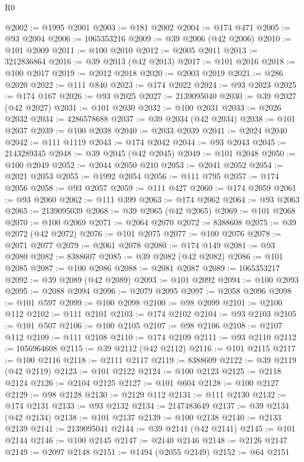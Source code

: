 \begin{lexlean}{R0}
\begin{coremodule}
@2002 := @1995 @2001
@2003 := @181 @2002
@2004 := @174 @471
@2005 := @93 @2004
@2006 := 1065353216
@2009 := @39 @2006 (@42 @2006)
@2010 := @101 @2009
@2011 := @100 @2010
@2012 := @2005 @2011
@2013 := 3212836864
@2016 := @39 @2013 (@42 @2013)
@2017 := @101 @2016
@2018 := @100 @2017
@2019 := @2012 @2018
@2020 := @2003 @2019
@2021 := @286 @2020
@2022 := @111 @840
@2023 := @174 @2022
@2024 := @93 @2023
@2025 := @174 @167
@2026 := @93 @2025
@2027 := 2139095040
@2030 := @39 @2027 (@42 @2027)
@2031 := @101 @2030
@2032 := @100 @2031
@2033 := @2026 @2032
@2034 := 4286578688
@2037 := @39 @2034 (@42 @2034)
@2038 := @101 @2037
@2039 := @100 @2038
@2040 := @2033 @2039
@2041 := @2024 @2040
@2042 := @111 @1119
@2043 := @174 @2042
@2044 := @93 @2043
@2045 := 2143289345
@2048 := @39 @2045 (@42 @2045)
@2049 := @101 @2048
@2050 := @100 @2049
@2052 := @2044 @2050 @210
@2053 := @2041 @2052
@2054 := @2021 @2053
@2055 := @1992 @2054
@2056 := @111 @795
@2057 := @174 @2056
@2058 := @93 @2057
@2059 := @111 @427
@2060 := @174 @2059
@2061 := @93 @2060
@2062 := @111 @399
@2063 := @174 @2062
@2064 := @93 @2063
@2065 := 2139095039
@2068 := @39 @2065 (@42 @2065)
@2069 := @101 @2068
@2070 := @100 @2069
@2071 := @2064 @2070
@2072 := 8388608
@2075 := @39 @2072 (@42 @2072)
@2076 := @101 @2075
@2077 := @100 @2076
@2078 := @2071 @2077
@2079 := @2061 @2078
@2080 := @174 @149
@2081 := @93 @2080
@2082 := 8388607
@2085 := @39 @2082 (@42 @2082)
@2086 := @101 @2085
@2087 := @100 @2086
@2088 := @2081 @2087
@2089 := 1065353217
@2092 := @39 @2089 (@42 @2089)
@2093 := @101 @2092
@2094 := @100 @2093
@2095 := @2088 @2094
@2096 := @2079 @2095
@2097 := @2058 @2096
@2098 := @101 @597
@2099 := @100 @2098
@2100 := @98 @2099
@2101 := @2100 @112
@2102 := @111 @2101
@2103 := @174 @2102
@2104 := @93 @2103
@2105 := @101 @507
@2106 := @100 @2105
@2107 := @98 @2106
@2108 := @2107 @112
@2109 := @111 @2108
@2110 := @174 @2109
@2111 := @93 @2110
@2112 := 1056964608
@2115 := @39 @2112 (@42 @2112)
@2116 := @101 @2115
@2117 := @100 @2116
@2118 := @2111 @2117
@2119 := 8388609
@2122 := @39 @2119 (@42 @2119)
@2123 := @101 @2122
@2124 := @100 @2123
@2125 := @2118 @2124
@2126 := @2104 @2125
@2127 := @101 @604
@2128 := @100 @2127
@2129 := @98 @2128
@2130 := @2129 @112
@2131 := @111 @2130
@2132 := @174 @2131
@2133 := @93 @2132
@2134 := 2147483649
@2137 := @39 @2134 (@42 @2134)
@2138 := @101 @2137
@2139 := @100 @2138
@2140 := @2133 @2139
@2141 := 2139095041
@2144 := @39 @2141 (@42 @2141)
@2145 := @101 @2144
@2146 := @100 @2145
@2147 := @2140 @2146
@2148 := @2126 @2147
@2149 := @2097 @2148
@2151 := @1494 (@2055 @2149)
@2152 := @64 @2151

\end{coremodule}
\end{lexlean}
